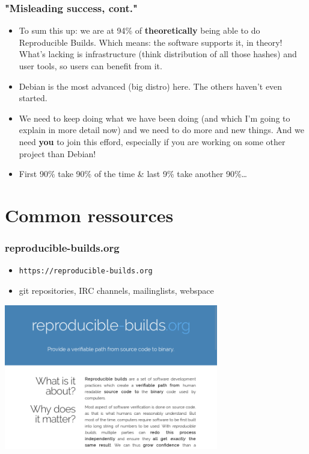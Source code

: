 \documentclass[14pt,aspectratio=169]{beamer}
\begin{document}
\begin{frame}
 \frametitle{"Misleading success, cont."}
 \begin{itemize}
 \item To sum this up: we are at 94\% of \textbf{theoretically} being able to do Reproducible Builds. Which means: the software supports it, in theory! What's lacking is infrastructure (think distribution of all those hashes) and user tools, so users can benefit from it.
 \item<2-4> Debian is the most advanced (big distro) here. The others haven't even started.
 \item<3-4> We need to keep doing what we have been doing (and which I'm going to explain in more detail now) and we need to do more and new things. And we need \textbf{you} to join this efford, especially if you are working on some other project than Debian!
 \item<4> First 90\% take 90\% of the time \& last 9\% take another 90\%…

 \end{itemize}
\end{frame}

\section{Common ressources}

\begin{frame}
 \frametitle{reproducible-builds.org}

 \begin{itemize}
  \item \texttt{https://reproducible-builds.org}
  \item git repositories, IRC channels, mailinglists, webspace
 \end{itemize}
 \begin{center}
 \includegraphics[width=0.7\textwidth]{images/rbwww1.png}
 \end{center}
\end{frame}
\end{document}
